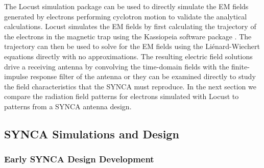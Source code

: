 The Locust simulation package \cite{Ashtari_Esfahani_2019} can be used to directly simulate the EM fields generated by electrons performing cyclotron motion to validate the analytical calculations. Locust simulates the EM fields by first calculating the trajectory of the electrons in the magnetic trap using the Kassiopeia software package \cite{Furse_2017}. The trajectory can then be used to solve for the EM fields using the Li\'{e}nard-Wiechert equations directly with no approximations. The resulting electric field solutions drive a receiving antenna by convolving the time-domain fields with the finite-impulse response filter of the antenna or they can be examined directly to study the field characteristics that the SYNCA must reproduce. In the next section we compare the radiation field patterns for electrons simulated with Locust to patterns from a SYNCA antenna design.

\subsection{SYNCA Simulations and Design}
\label{sec:synca_design}

\subsubsection*{Early SYNCA Design Development}

